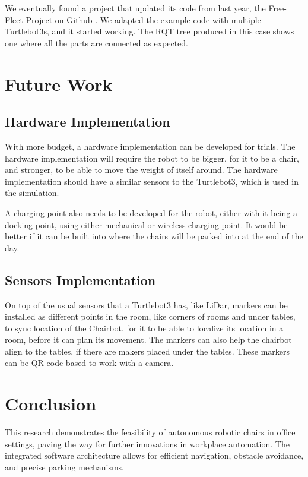 \documentclass[a4paper,twocolumn]{article}
\begin{document}
We eventually found a project that updated its code from last year, the Free-Fleet Project on Github \cite{freefleet}. We adapted the example code with multiple Turtlebot3s, and it started working. The RQT tree produced in this case shows one where all the parts are connected as expected. 

\section{Future Work}
\subsection{Hardware Implementation}
With more budget, a hardware implementation can be developed for trials. The hardware implementation will require the robot to be bigger, for it to be a chair, and stronger, to be able to move the weight of itself around. The hardware implementation should have a similar sensors to the Turtlebot3, which is used in the simulation. 

A charging point also needs to be developed for the robot, either with it being a docking point, using either mechanical or wireless charging point. It would be better if it can be built into where the chairs will be parked into at the end of the day.

\subsection{Sensors Implementation}
On top of the usual sensors that a Turtlebot3 has, like LiDar, markers can be installed as different points in the room, like corners of rooms and under tables, to sync location of the Chairbot, for it to be able to localize its location in a room, before it can plan its movement. The markers can also help the chairbot align to the tables, if there are makers placed under the tables. These markers can be QR code based to work with a camera. 

\section{Conclusion}
This research demonstrates the feasibility of autonomous robotic chairs in office settings, paving the way for further innovations in workplace automation. The integrated software architecture allows for efficient navigation, obstacle avoidance, and precise parking mechanisms.
\end{document}
